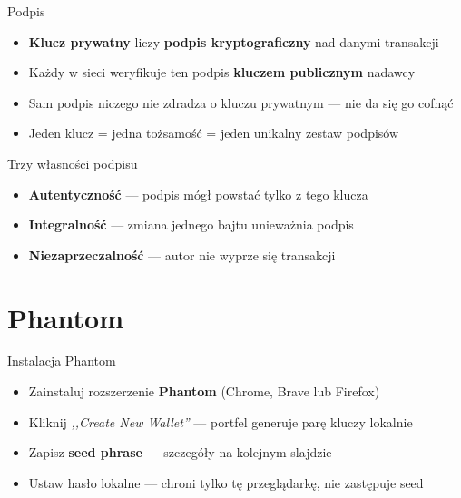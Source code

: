 \begin{frame}{Podpis}
  \begin{itemize}
    \item \textbf{Klucz prywatny} liczy \textbf{podpis kryptograficzny} nad danymi transakcji
    \item Każdy w sieci weryfikuje ten podpis \textbf{kluczem publicznym} nadawcy
    \item Sam podpis niczego nie zdradza o kluczu prywatnym --- nie da się go cofnąć
    \item Jeden klucz = jedna tożsamość = jeden unikalny zestaw podpisów
  \end{itemize}
  \vspace{0.25cm}
  \begin{block}{Trzy własności podpisu}
    \begin{itemize}
      \item \textbf{Autentyczność} --- podpis mógł powstać tylko z tego klucza
      \item \textbf{Integralność} --- zmiana jednego bajtu unieważnia podpis
      \item \textbf{Niezaprzeczalność} --- autor nie wyprze się transakcji
    \end{itemize}
  \end{block}
\end{frame}

\section{Phantom}

\begin{frame}{Instalacja Phantom}
  \begin{itemize}
    \item Zainstaluj rozszerzenie \textbf{Phantom} (Chrome, Brave lub Firefox)
    \item Kliknij \textit{,,Create New Wallet''} --- portfel generuje parę kluczy lokalnie
    \item Zapisz \textbf{seed phrase} --- szczegóły na kolejnym slajdzie
    \item Ustaw hasło lokalne --- chroni tylko tę przeglądarkę, nie zastępuje seed
  \end{itemize}
\end{frame}

